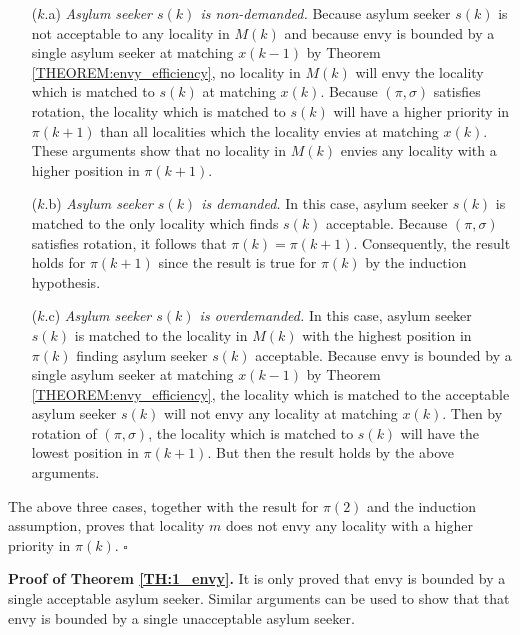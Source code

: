 \documentclass[12pt,fleqn]{article}
\begin{document}
\begin{itemize}
\item[($k$.a)] \emph{Asylum seeker $s(k)$ is non-demanded.} Because asylum seeker $s(k)$ is not acceptable to any locality in $M(k)$ and because envy is bounded by a single asylum seeker at matching $x(k-1)$ by Theorem \ref{THEOREM:envy_efficiency}, no locality in $M(k)$ will envy the locality which is matched to $s(k)$ at matching $x(k)$. Because $(\pi,\sigma)$ satisfies rotation, the locality which is matched to $s(k)$ will have a higher priority in $\pi(k+1)$ than all localities which the locality envies at matching $x(k)$. These arguments show that no locality in $M(k)$ envies any locality with a higher position in $\pi(k+1)$.

\item[($k$.b)] \emph{Asylum seeker $s(k)$ is demanded.} In this case, asylum seeker $s(k)$ is matched to the only locality which finds $s(k)$ acceptable. Because $(\pi,\sigma)$ satisfies rotation, it follows that $\pi(k)=\pi(k+1)$. Consequently, the result holds for $\pi(k+1)$ since the result is true for $\pi(k)$ by the induction hypothesis.

\item[($k$.c)] \emph{Asylum seeker $s(k)$ is overdemanded.} In this case, asylum seeker $s(k)$ is matched to the locality in $M(k)$ with the highest position in $\pi(k)$ finding asylum seeker $s(k)$ acceptable. Because envy is bounded by a single asylum seeker at matching $x(k-1)$ by Theorem \ref{THEOREM:envy_efficiency}, the locality which is matched to the acceptable asylum seeker $s(k)$ will not envy any locality at matching $x(k)$. Then by rotation of $(\pi,\sigma)$, the locality which is matched to $s(k)$ will have the lowest position in $\pi(k+1)$. But then the result holds by the above arguments.
\end{itemize}

\noindent The above three cases, together with the result for $\pi(2)$ and the induction assumption, proves that locality $m$ does not envy any locality with a higher priority in $\pi(k)$. \hfill $\square$

\medskip

\noindent\textbf{Proof of Theorem \ref{TH:1_envy}.} It is only proved that envy is bounded by a single acceptable asylum seeker. Similar arguments can be used to show that that envy is bounded by a single unacceptable asylum seeker.
\end{document}
